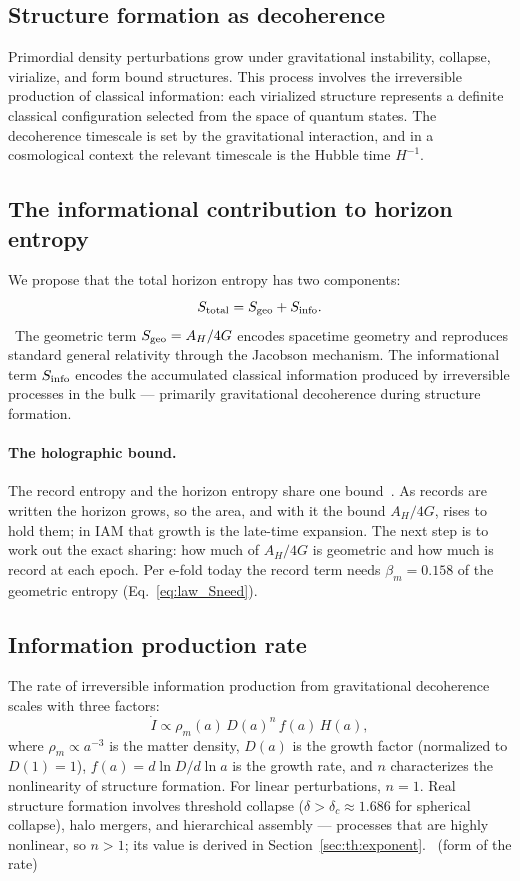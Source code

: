 \subsection{Structure formation as decoherence}
Primordial density perturbations grow under gravitational instability, collapse, virialize, and form bound structures. This process involves the
irreversible production of classical information: each virialized structure represents a definite classical configuration selected from the space of
quantum states. The decoherence timescale is set by the gravitational interaction, and in a cosmological context the relevant timescale is the Hubble
time $H^{-1}$.

\subsection{The informational contribution to horizon entropy}
We propose that the total horizon entropy has two components:
\begin{equation}S_{\rm total}=S_{\rm geo}+S_{\rm info}.\label{eq:th:Stotal}\end{equation}
\conjecture\ The geometric term $S_{\rm geo}=A_H/4G$ encodes spacetime geometry and reproduces standard general relativity through the Jacobson mechanism.
The informational term $S_{\rm info}$ encodes the accumulated classical information produced by irreversible processes in the bulk --- primarily
gravitational decoherence during structure formation.

\paragraph{The holographic bound.} The record entropy and the horizon entropy share one bound~\cite{tHooft1993,Susskind1995,Bousso2002}.
As records are written the horizon grows, so the area, and with it the bound $A_H/4G$, rises to hold them; in IAM that growth is the
late-time expansion. \interp{} The next step is to work out the exact sharing: how much of $A_H/4G$ is geometric and how much is record at
each epoch. Per e-fold today the record term needs $\beta_m=0.158$ of the geometric entropy (Eq.~\eqref{eq:law_Sneed}). \openprob
\subsection{Information production rate}
The rate of irreversible information production from gravitational decoherence scales with three factors:
\begin{equation}\dot I\propto\rho_m(a)\,D(a)^n\,f(a)\,H(a),\label{eq:Idot}\end{equation}
where $\rho_m\propto a^{-3}$ is the matter density, $D(a)$ is the growth factor (normalized to $D(1)=1$), $f(a)=d\ln D/d\ln a$ is the growth rate, and
$n$ characterizes the nonlinearity of structure formation. For linear perturbations, $n=1$. Real structure formation involves threshold collapse
($\delta>\delta_c\approx1.686$ for spherical collapse), halo mergers, and hierarchical assembly --- processes that are highly nonlinear, so $n>1$; its
value is derived in Section~\ref{sec:th:exponent}. \conjecture\ (form of the rate)


